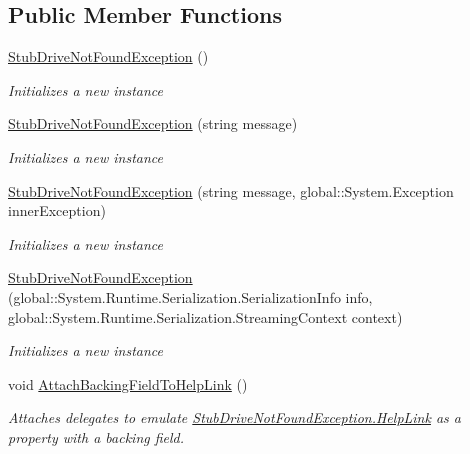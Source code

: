 \subsection*{Public Member Functions}
\begin{DoxyCompactItemize}
\item 
\hyperlink{class_system_1_1_i_o_1_1_fakes_1_1_stub_drive_not_found_exception_a40cca7d4df9c0b394d9a042c4b8a96d7}{Stub\-Drive\-Not\-Found\-Exception} ()
\begin{DoxyCompactList}\small\item\em Initializes a new instance\end{DoxyCompactList}\item 
\hyperlink{class_system_1_1_i_o_1_1_fakes_1_1_stub_drive_not_found_exception_ae9794b2e86a951763fb3ff6230062c52}{Stub\-Drive\-Not\-Found\-Exception} (string message)
\begin{DoxyCompactList}\small\item\em Initializes a new instance\end{DoxyCompactList}\item 
\hyperlink{class_system_1_1_i_o_1_1_fakes_1_1_stub_drive_not_found_exception_aa385c015232680104bc6e767f45ad2d4}{Stub\-Drive\-Not\-Found\-Exception} (string message, global\-::\-System.\-Exception inner\-Exception)
\begin{DoxyCompactList}\small\item\em Initializes a new instance\end{DoxyCompactList}\item 
\hyperlink{class_system_1_1_i_o_1_1_fakes_1_1_stub_drive_not_found_exception_a39fabaafb01382b28a22bf075096d0f2}{Stub\-Drive\-Not\-Found\-Exception} (global\-::\-System.\-Runtime.\-Serialization.\-Serialization\-Info info, global\-::\-System.\-Runtime.\-Serialization.\-Streaming\-Context context)
\begin{DoxyCompactList}\small\item\em Initializes a new instance\end{DoxyCompactList}\item 
void \hyperlink{class_system_1_1_i_o_1_1_fakes_1_1_stub_drive_not_found_exception_a1585343e84e98b1d6438ed3202c29b41}{Attach\-Backing\-Field\-To\-Help\-Link} ()
\begin{DoxyCompactList}\small\item\em Attaches delegates to emulate \hyperlink{class_system_1_1_i_o_1_1_fakes_1_1_stub_drive_not_found_exception_a8060506c31998837d625258ac53df388}{Stub\-Drive\-Not\-Found\-Exception.\-Help\-Link} as a property with a backing field.\end{DoxyCompactList}\item 

\end{DoxyCompactItemize}
